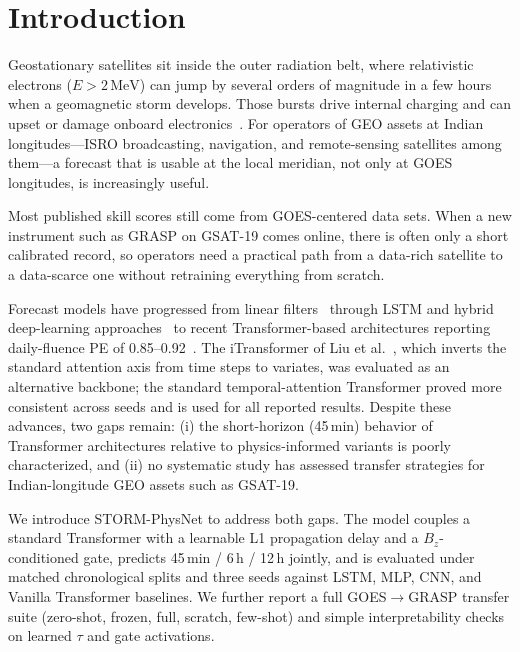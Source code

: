 \documentclass[conference]{IEEEtran}
\begin{document}
\section{Introduction}
Geostationary satellites sit inside the outer radiation belt, where
relativistic electrons (\(E>2\,\mathrm{MeV}\)) can jump by several orders of
magnitude in a few hours when a geomagnetic storm develops. Those bursts drive
internal charging and can upset or damage onboard electronics~\cite{baker2018space,horne2005wave}.
For operators of GEO assets at Indian longitudes---ISRO broadcasting,
navigation, and remote-sensing satellites among them---a forecast that is
usable at the local meridian, not only at GOES longitudes, is increasingly
useful.

Most published skill scores still come from GOES-centered data sets. When a
new instrument such as GRASP on GSAT-19 comes online, there is often only a
short calibrated record, so operators need a practical path from a data-rich
satellite to a data-scarce one without retraining everything from scratch.

Forecast models have progressed from linear filters~\cite{baker1990,perry2010}
through LSTM and hybrid deep-learning approaches~\cite{wei2018,son2022,zhang2022emd}
to recent Transformer-based architectures reporting daily-fluence PE of
0.85--0.92~\cite{sun2025fsl,tan2024tpa,sun2024swsc}. The iTransformer
of Liu et al.~\cite{liu2024itrans}, which inverts the standard attention
axis from time steps to variates, was evaluated as an alternative backbone;
the standard temporal-attention Transformer proved more consistent across
seeds and is used for all reported results. Despite these advances, two
gaps remain: (i) the short-horizon (45\,min) behavior of
Transformer architectures relative to physics-informed variants is poorly
characterized, and (ii) no systematic study has assessed transfer strategies
for Indian-longitude GEO assets such as GSAT-19.

We introduce STORM-PhysNet to address both gaps. The model couples a
standard Transformer with a learnable L1 propagation delay and a
\(B_z\)-conditioned gate, predicts 45\,min / 6\,h / 12\,h jointly, and is
evaluated under matched chronological splits and three seeds against LSTM,
MLP, CNN, and Vanilla Transformer baselines. We further report a full
GOES\(\rightarrow\)GRASP transfer suite (zero-shot, frozen, full, scratch,
few-shot) and simple interpretability checks on learned \(\tau\) and gate
activations.
\end{document}
